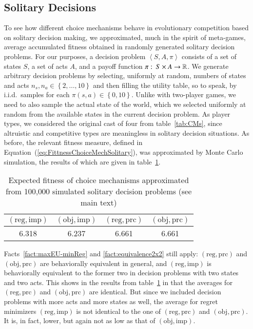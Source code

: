 \documentclass[fleqn,reqno,12pt]{article}
\theoremstyle{Satz}
\theoremstyle{Bsp}
\newcommand{\set}[1]{\left\{#1\right\}}
\newcommand{\tuple}[1]{\left \langle #1\right\rangle}
\newcommand{\mycolon}{\ensuremath{\thinspace \colon \thinspace}}
\newcommand{\Acts}{\ensuremath{A}\xspace}		%
\newcommand{\act}{\ensuremath{a}\xspace}		%
\begin{document}
\subsection{Solitary Decisions}
\label{sec:solitary-decisions}

To see how different choice mechanisms behave in evolutionary competition based on solitary
decision making, we approximated, much in the spirit of meta-games, average accumulated
fitness obtained in randomly generated solitary decision problems. For our purposes, a decision
problem $\tuple{S, \Acts, \pi}$ consists of a set of states $S$, a set of acts $\Acts$, and
a payoff function $\pi \mycolon S \times \Acts \rightarrow \mathbb{R}$.  We generate arbitrary
decision problems by selecting, uniformly at random, numbers of states and acts
$n_s, n_\act \in \set{2, \dots, 10}$ and then filling the utility table, so to speak, by
i.i.d.~samples for each $\pi(s, \act) \in \set{0, 10}$. Unlike with
two-player games, we need to also sample the actual state of the world, which we selected
uniformly at random from the available states in the current decision problem. As player types,
we considered the original cast of four from table~\ref{tab:CMs}, since altruistic and
competitive types are meaningless in solitary decision situations. As before, the
relevant fitness measure, defined in Equation~(\ref{eq:FittnessChoiceMechSolitary}), was
approximated by Monte Carlo simulation, the results of which are given in
table~\ref{tab:SolitaryDecisions}.

\begin{table}
  \centering
  \begin{tabular}{cccc}
    \toprule
   $(\text{reg}, \text{imp})$ 
 & $(\text{obj}, \text{imp})$ 
 & $(\text{reg}, \text{prc})$ 
 & $(\text{obj}, \text{prc})$ 
 \\ \midrule
    6.318 & 6.237 & 6.661 & 6.661 \\ \bottomrule
  \end{tabular}
  \caption{Expected fitness of choice mechanisms approximated from 100,000 simulated solitary
    decision problems (see main text)}
  \label{tab:SolitaryDecisions}
\end{table}

Facts~\ref{fact:maxEU-minReg} and \ref{fact:equivalence2x2} still apply:
$(\text{reg}, \text{prc})$ and $(\text{obj}, \text{prc})$ are behaviorally equivalent in
general, and $(\text{reg}, \text{imp})$ is behaviorally equivalent to the former two in
decision problems with two states and two acts. This shows in the results from
table~\ref{tab:SolitaryDecisions} in that the averages for $(\text{reg}, \text{prc})$ and
$(\text{obj}, \text{prc})$ are identical. But since we included decision problems with more
acts and more states as well, the average for regret minimizers $(\text{reg}, \text{imp})$ is
not identical to the one of $(\text{reg}, \text{prc})$ and $(\text{obj}, \text{prc})$. It
is, in fact, lower, but again not as low as that of $(\text{obj}, \text{imp})$.
\end{document}
